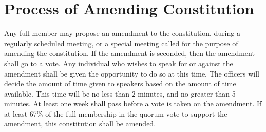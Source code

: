 \documentclass{article}
\begin{document}
\section{Process of Amending Constitution}
Any full member may propose an amendment to the constitution,
during a regularly scheduled meeting, or a special meeting called
for the purpose of amending the constitution. If the amendment is
seconded, then the amendment shall go to a vote. Any individual who
wishes to speak for or against the amendment shall be given the
opportunity to do so at this time. The officers will decide the
amount of time given to speakers based on the amount of time available.
This time will be no less than 2 minutes, and no greater than 5 minutes.
At least one week shall pass before a vote is taken on the amendment.
If at least 67\% of the full membership in the quorum vote to support
the amendment, this constitution shall be amended.
\end{document}
